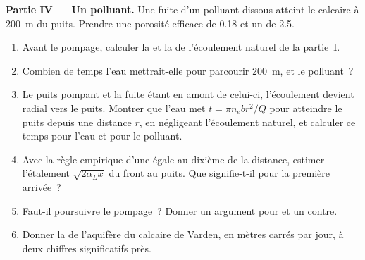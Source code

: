 \begin{problem}
\medskip\noindent\textbf{Partie IV --- Un polluant.} Une fuite d'un polluant dissous
atteint le calcaire à \qty{200}{m} du puits. Prendre une porosité efficace de
0.18 et un  de 2.5.
\begin{enumerate}[resume]
\item Avant le pompage, calculer la  et la 
  de l'écoulement naturel de la partie~I.
\item Combien de temps l'eau mettrait-elle pour parcourir \qty{200}{m}, et le
  polluant~?
\item Le puits pompant et la fuite étant en amont de celui-ci, l'écoulement
  devient radial vers le puits. Montrer que l'eau met $t = \pi n_e b
  r^2/Q$ pour atteindre le puits depuis une distance $r$, en négligeant l'écoulement
  naturel, et calculer ce temps pour l'eau et pour le polluant.
\item Avec la règle empirique d'une  égale au dixième de la distance,
  estimer l'étalement $\sqrt{2\alpha_Lx}$ du front au puits. Que
  signifie-t-il pour la première arrivée~?
\item Faut-il poursuivre le pompage~? Donner un argument pour et un contre.
\item Donner la  de l'aquifère du calcaire de Varden, en mètres carrés par
  jour, à deux chiffres significatifs près.
\end{enumerate}
\end{problem}
